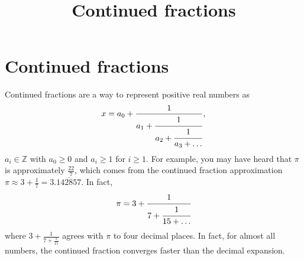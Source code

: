 \documentclass{ximera}
\title{Continued fractions}
\begin{document}
  
\begin{abstract}  
\end{abstract}  
\maketitle  

\section*{Continued fractions}
Continued fractions are a way to represent positive real numbers as
\[x=a_0+\frac{1}{a_1+\cfrac{1}{a_2+\cfrac{1}{a_3+\dots}}},\]
$a_i\in\mathbb{Z}$ with $a_0\geq 0$ and $a_i\geq 1$ for $i\geq 1$. For example, you may have heard that $\pi$ is approximately $\frac{22}{7}$, which comes from the continued fraction approximation $\pi\approx3+\frac{1}{7}=3.\overline{142857}$. In fact, 
\begin{equation}\label{merriman_pi}\pi=3+\cfrac{1}{7+\cfrac{1}{15+\dots}}\end{equation}
where $3+\frac{1}{7+\frac{1}{15}}$ agrees with $\pi$ to four decimal places. In fact, for almost all numbers, the continued fraction converges faster than the decimal expansion. 
 
\end{document}
